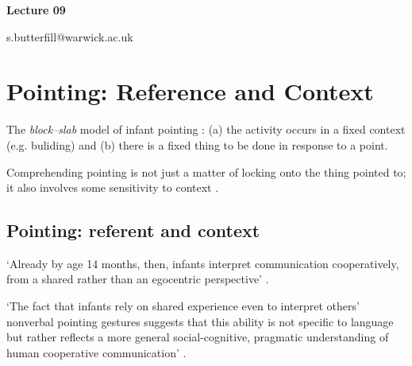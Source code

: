 \documentclass[12pt]{extarticle}
\date{}
\makeatletter
\def \ititle {Origins of Mind}
\def \iemail{s.butterfill@warwick.ac.uk}
\makeatother
\begin{document}
\begin{multicols}{3}

\setlength\footnotesep{1em}









\def \ititle {Lecture 09}

\begin{center}

{\Large

\textbf{\ititle}

}



\iemail %

\end{center}






\section{Pointing: Reference and Context}

The \emph{block--slab} model of infant pointing \citep[compare][§2]{Wittgenstein:1953mm}:
(a) the activity occurs in a fixed context (e.g. buliding) and (b)
there is a fixed thing to be done in response to a point.

Comprehending pointing is not just a matter of locking onto the thing pointed to; it also
involves some sensitivity to context \citep[see][]{Liebal:2010lr}.

\subsection{Pointing: referent and context}

‘Already by age 14 months, then, infants interpret communication cooperatively, from a shared rather than an egocentric perspective’ \citep[p.\ 269]{Liebal:2010lr}.

‘The fact that infants rely on shared experience even to interpret others’ nonverbal pointing gestures suggests that this ability is not specific to language but rather reflects a more general social-cognitive, pragmatic understanding of human cooperative communication’ \citep[p.\ 270]{Liebal:2010lr}.




\end{multicols}
\end{document}
